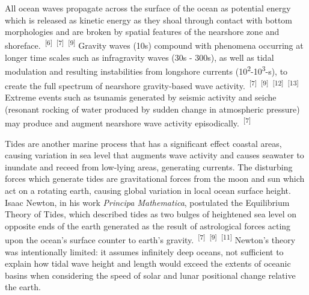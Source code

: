 \documentclass{article}
\begin{document}
\par{All ocean waves propagate across the surface of the ocean as potential energy which is released as kinetic energy as they shoal through contact with bottom morphologies and are broken by spatial features of the nearshore zone and shoreface.~\textsuperscript{[6]}~\textsuperscript{[7]}~\textsuperscript{[9]} Gravity waves (10s) compound with phenomena occurring at longer time scales such as infragravity waves (30s - 300s), as well as tidal modulation and resulting instabilities from longshore currents (10\textsuperscript{2}-10\textsuperscript{3}-s), to create the full spectrum of nearshore gravity-based wave activity.~\textsuperscript{[7]}~\textsuperscript{[9]}~\textsuperscript{[12]}~\textsuperscript{[13]} Extreme events such as tsunamis generated by seismic activity and seiche (resonant rocking of water produced by sudden change in atmospheric pressure) may produce and augment nearshore wave activity episodically.~\textsuperscript{[7]}}

\par{Tides are another marine process that has a significant effect coastal areas, causing variation in sea level that augments wave activity and causes seawater to inundate and receed from low-lying areas, generating currents. The disturbing forces which generate tides are gravitational forces from the moon and sun which act on a rotating earth, causing global variation in local ocean surface height. Isaac Newton, in his work \textit{Principa Mathematica}, postulated the Equilibrium Theory of Tides, which described tides as two bulges of heightened sea level on opposite ends of the earth generated as the result of astrological forces acting upon the ocean's surface counter to earth's gravity.~\textsuperscript{[7]}~\textsuperscript{[9]}~\textsuperscript{[11]} Newton's theory was intentionally limited: it assumes infinitely deep oceans, not sufficient to explain how tidal wave height and length would exceed the extents of oceanic basins when considering the speed of solar and lunar positional change relative the earth.}
\end{document}
